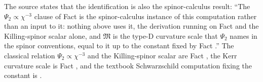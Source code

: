 The source states that the identification is also the spinor-calculus result: ``The $\Psi_2 \propto \chi^{-3}$ clause of Fact  is the spinor-calculus instance of this computation rather than an input to it: nothing above uses it, the derivation running on Fact  and the Killing-spinor scalar alone, and $\mathfrak M$ is the type-D curvature scale that $\Psi_2$ names in the spinor conventions, equal to it up to the constant fixed by Fact .'' The classical relation $\Psi_2 \propto \chi^{-3}$ and the Killing-spinor scalar are Fact , the Kerr curvature scale is Fact , and the textbook Schwarzschild computation fixing the constant is .
